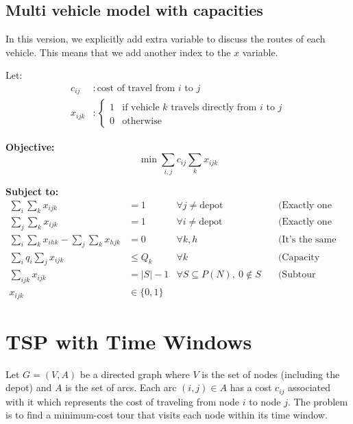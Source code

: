 \subsection{Multi vehicle model with capacities}
In this version, we explicitly add extra variable to discuss the routes of each vehicle.   This means that we add another index to the $x$ variable.


Let:
\begin{align*}
c_{ij} & : \text{cost of travel from } i \text{ to } j \\
x_{ijk} & : 
\begin{cases} 
1 & \text{if vehicle } k \text{ travels directly from } i \text{ to } j \\
0 & \text{otherwise}
\end{cases}
\end{align*}

\textbf{Objective:}
\begin{equation}
\min \sum_{i,j} c_{ij} \sum_k x_{ijk}
\end{equation}

\textbf{Subject to:}
\begin{align}
\sum_{i} \sum_{k} x_{ijk} &= 1 & \forall j \neq \text{depot} & \quad \text{(Exactly one vehicle in)} \\
\sum_{j} \sum_{k} x_{ijk} &= 1 & \forall i \neq \text{depot} & \quad \text{(Exactly one vehicle out)} \\
\sum_{i} \sum_{k} x_{ihk} - \sum_{j} \sum_{k} x_{hjk} &= 0 & \forall k, h & \quad \text{(It's the same vehicle)} \\
\sum_{i} q_i \sum_{j} x_{ijk} &\leq Q_k & \forall k & \quad \text{(Capacity constraint)} \\
\sum_{ijk} x_{ijk} &= |S| - 1 & \forall S \subseteq P(N), \ 0 \notin S & \quad \text{(Subtour elimination)} \\
x_{ijk} &\in \{0,1\}
\end{align}


\section{TSP with Time Windows}
Let $G = (V, A)$ be a directed graph where $V$ is the set of nodes (including the depot) and $A$ is the set of arcs. Each arc $(i,j) \in A$ has a cost $c_{ij}$ associated with it which represents the cost of traveling from node $i$ to node $j$. The problem is to find a minimum-cost tour that visits each node within its time window.

